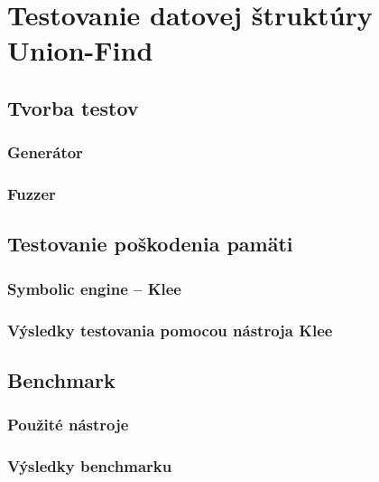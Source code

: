 \chapter{Testovanie datovej štruktúry Union-Find} \label{testovanie}

\section{Tvorba testov}

\subsection{Generátor}

\subsection{Fuzzer}

\section{Testovanie poškodenia pamäti} \label{symbolic_engine}

\subsection{Symbolic engine -- Klee}

\subsection{Výsledky testovania pomocou nástroja Klee}

\section{Benchmark} \label{benchmark}

\subsection{Použité nástroje}

\subsection{Výsledky benchmarku}